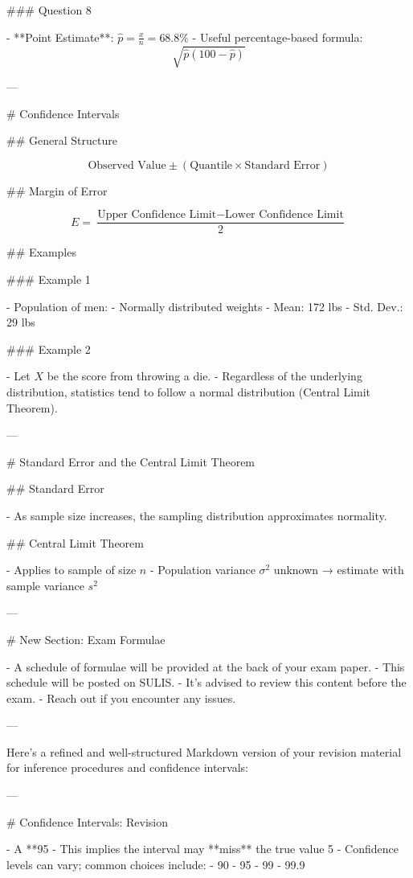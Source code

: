 ### Question 8

- **Point Estimate**: \( \hat{p} = \frac{x}{n} = 68.8\% \)
- Useful percentage-based formula:
  \[
  \sqrt{ \hat{p}(100 - \hat{p}) }
  \]

---

# Confidence Intervals

## General Structure

\[
\text{Observed Value} \pm (\text{Quantile} \times \text{Standard Error})
\]

## Margin of Error

\[
E = \frac{\text{Upper Confidence Limit} - \text{Lower Confidence Limit}}{2}
\]

## Examples

### Example 1

- Population of men:  
  - Normally distributed weights  
  - Mean: 172 lbs  
  - Std. Dev.: 29 lbs

### Example 2

- Let \( X \) be the score from throwing a die.  
- Regardless of the underlying distribution, statistics tend to follow a normal distribution (Central Limit Theorem).

---

# Standard Error and the Central Limit Theorem

## Standard Error

- As sample size increases, the sampling distribution approximates normality.

## Central Limit Theorem

- Applies to sample of size \( n \)
- Population variance \( \sigma^2 \) unknown → estimate with sample variance \( s^2 \)

---

# New Section: Exam Formulae

- A schedule of formulae will be provided at the back of your exam paper.
- This schedule will be posted on SULIS.
- It’s advised to review this content before the exam.
- Reach out if you encounter any issues.

---







Here’s a refined and well-structured Markdown version of your revision material for inference procedures and confidence intervals:

---

# Confidence Intervals: Revision

- A **95%
- This implies the interval may **miss** the true value 5%
- Confidence levels can vary; common choices include:
  - 90%
  - 95%
  - 99%
  - 99.9%

